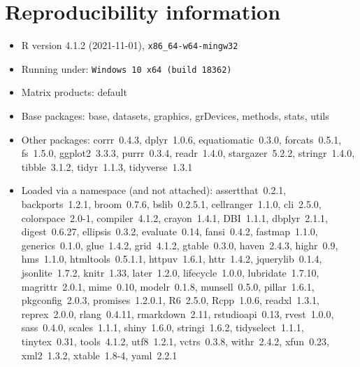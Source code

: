 \documentclass[
]{article}
\begin{document}
\hypertarget{reproducibility-information}{%
\section{Reproducibility
information}\label{reproducibility-information}}

\begin{itemize}\raggedright
  \item R version 4.1.2 (2021-11-01), \verb|x86_64-w64-mingw32|
  \item Running under: \verb|Windows 10 x64 (build 18362)|
  \item Matrix products: default
  \item Base packages: base, datasets, graphics, grDevices, methods, stats, utils
  \item Other packages: corrr~0.4.3, dplyr~1.0.6, equatiomatic~0.3.0, forcats~0.5.1,
    fs~1.5.0, ggplot2~3.3.3, purrr~0.3.4, readr~1.4.0, stargazer~5.2.2, stringr~1.4.0,
    tibble~3.1.2, tidyr~1.1.3, tidyverse~1.3.1
  \item Loaded via a namespace (and not attached): assertthat~0.2.1, backports~1.2.1,
    broom~0.7.6, bslib~0.2.5.1, cellranger~1.1.0, cli~2.5.0, colorspace~2.0-1,
    compiler~4.1.2, crayon~1.4.1, DBI~1.1.1, dbplyr~2.1.1, digest~0.6.27, ellipsis~0.3.2,
    evaluate~0.14, fansi~0.4.2, fastmap~1.1.0, generics~0.1.0, glue~1.4.2, grid~4.1.2,
    gtable~0.3.0, haven~2.4.3, highr~0.9, hms~1.1.0, htmltools~0.5.1.1, httpuv~1.6.1,
    httr~1.4.2, jquerylib~0.1.4, jsonlite~1.7.2, knitr~1.33, later~1.2.0, lifecycle~1.0.0,
    lubridate~1.7.10, magrittr~2.0.1, mime~0.10, modelr~0.1.8, munsell~0.5.0, pillar~1.6.1,
    pkgconfig~2.0.3, promises~1.2.0.1, R6~2.5.0, Rcpp~1.0.6, readxl~1.3.1, reprex~2.0.0,
    rlang~0.4.11, rmarkdown~2.11, rstudioapi~0.13, rvest~1.0.0, sass~0.4.0, scales~1.1.1,
    shiny~1.6.0, stringi~1.6.2, tidyselect~1.1.1, tinytex~0.31, tools~4.1.2, utf8~1.2.1,
    vctrs~0.3.8, withr~2.4.2, xfun~0.23, xml2~1.3.2, xtable~1.8-4, yaml~2.2.1
\end{itemize}
\end{document}
